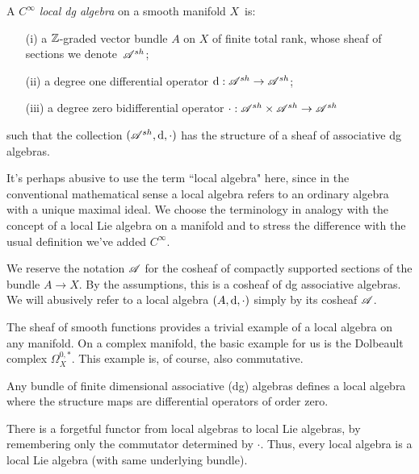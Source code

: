 \begin{dfn}\label{def: localalg}
A {\em $C^\infty$ local dg algebra} on a smooth manifold $X$~is:
\begin{enumerate}
\item[(i)] a $\mathbb Z$-graded vector bundle $A$ on $X$ of finite total rank, whose sheaf of sections we denote~$\mathscr A^{sh}$;
\item[(ii)] a degree one differential operator ${\rm d} : \mathscr A^{sh} \to \mathscr A^{sh}$;
\item[(iii)] a degree zero bidifferential operator $\cdot : \mathscr A^{sh} \times \mathscr A^{sh} \to \mathscr A^{sh}$
\end{enumerate}
such that the collection $(\mathscr A^{sh}, {\rm d}, \cdot)$ has the structure of a sheaf of associative dg algebras.
\end{dfn}

\begin{rmk}
It's perhaps abusive to use the term ``local algebra" here, since in the conventional mathematical sense a local algebra refers to an ordinary algebra with a unique maximal ideal. 
We choose the terminology in analogy with the concept of a local Lie algebra on a manifold and to stress the difference with the usual definition we've added $C^\infty$. 
\end{rmk}

We reserve the notation $\mathscr A$ for the cosheaf of compactly supported sections of the bundle $A \to X$.
By the assumptions, this is a cosheaf of dg associative algebras. 
We will abusively refer to a local algebra $(A, {\rm d}, \cdot)$ simply by its cosheaf $\mathscr A$.

\begin{eg}
The sheaf of smooth functions provides a trivial example of a local algebra on any manifold. 
On a complex manifold, the basic example for us is the Dolbeault complex $\Omega^{0,*}_X$.
This example is, of course, also commutative. 
\end{eg}

Any bundle of finite dimensional associative (dg) algebras defines a local algebra where the structure maps are differential operators of order zero. 


There is a forgetful functor from local algebras to local Lie algebras, by remembering only the commutator determined by $\cdot$. 
Thus, every local algebra is a local Lie algebra (with same underlying bundle). 

